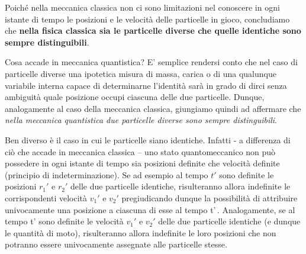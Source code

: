 Poiché nella meccanica classica non ci sono limitazioni nel conoscere in
ogni istante di tempo le posizioni e le velocità delle particelle in
gioco, concludiamo che \textbf{nella fisica classica sia le particelle
	diverse che quelle identiche sono sempre distinguibili}.
\bigskip

Cosa accade in meccanica quantistica?
E' semplice rendersi conto che nel
caso di particelle diverse una ipotetica misura di massa, carica o di
una qualunque variabile interna capace di determinarne l'identità sarà
in grado di dirci senza ambiguità quale posizione occupi ciascuna delle
due particelle.
Dunque, analogamente al caso della meccanica classica,
giungiamo quindi ad affermare che \emph{nella meccanica quantistica due
particelle diverse sono sempre distinguibili}.

Ben diverso è il caso in cui le particelle siano identiche.
Infatti - a
differenza di ciò che accade in meccanica classica -- uno stato
quantomeccanico non può possedere in ogni istante di tempo sia posizioni
definite che velocità definite (principio di indeterminazione).
Se ad
esempio al tempo \(t'\) sono definite le posizioni \(r_{1}'\) e
\(r_{2}'\) delle due particelle identiche, risulteranno allora
indefinite le corrispondenti velocità \(v_{1}'\) e \(v_{2}'\)
pregiudicando dunque la possibilità di attribuire univocamente una
posizione a ciascuna di esse al tempo t'\,.
Analogamente, se al tempo
t' sono definite le velocità \(v_{1}'\) e \(v_{2}'\) delle due
particelle identiche (e dunque le quantità di moto), risulteranno allora
indefinite le loro posizioni che non potranno essere univocamente
assegnate alle particelle stesse.

